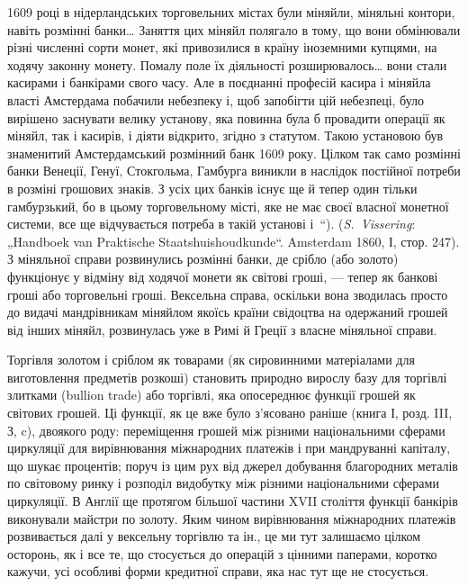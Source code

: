 {1609 році в нідерландських торговельних містах були міняйли, міняльні контори,
навіть розмінні банки\dots{} Заняття цих міняйл полягало в тому, що вони
обмінювали різні численні сорти монет, які привозилися в країну іноземними
купцями, на ходячу законну монету. Помалу поле їх діяльності розширювалось\dots{} вони стали касирами і банкірами свого часу. Але в поєднанні професій
касира і міняйла власті Амстердама побачили небезпеку і, щоб запобігти цій
небезпеці, було вирішено заснувати велику установу, яка повинна була б провадити
операції як міняйл, так і касирів, і діяти відкрито, згідно з статутом.
Такою установою був знаменитий Амстердамський розмінний банк 1609 року.
Цілком так само розмінні банки Венеції, Генуї, Стокгольма, Гамбурга виникли
в наслідок постійної потреби в розміні грошових знаків. З усіх цих банків
існує ще й тепер один тільки гамбурзький, бо в цьому торговельному місті, яке
не має своєї власної монетної системи, все ще відчувається потреба в такій
установі і~“). (\emph{S.~Vissering}: „Handboek van Praktische Staatshuishoudkunde“.
Amsterdam 1860, І, стор. 247).
} З міняльної справи розвинулись розмінні банки, де
срібло (або золото) функціонує у відміну від ходячої монети
як світові гроші, — тепер як банкові гроші або торговельні гроші.
Вексельна справа, оскільки вона зводилась просто до видачі мандрівникам
міняйлом якоїсь країни свідоцтва на одержаний грошей
від інших міняйл, розвинулась уже в Римі й Греції з власне
міняльної справи.

Торгівля золотом і сріблом як товарами (як сировинними
матеріалами для виготовлення предметів розкоші) становить
природно вирослу базу для торгівлі злитками (bullion trade) або
торгівлі, яка опосереднює функції грошей як світових грошей.
Ці функції, як це вже було з’ясовано раніше (книга І, розд. III,
З, c), двоякого роду: переміщення грошей між різними національними
сферами циркуляції для вирівнювання міжнародних
платежів і при мандруванні капіталу, що шукає процентів;
поруч із цим рух від джерел добування благородних металів
по світовому ринку і розподіл видобутку між різними національними
сферами циркуляції. В Англії ще протягом більшої
частини XVII століття функції банкірів виконували майстри
по золоту. Яким чином вирівнювання міжнародних платежів
розвивається далі у вексельну торгівлю та ін., це ми тут залишаємо
цілком осторонь, як і все те, що стосується до операцій
з цінними паперами, коротко кажучи, усі особливі форми
кредитної справи, яка нас тут ще не стосується.

